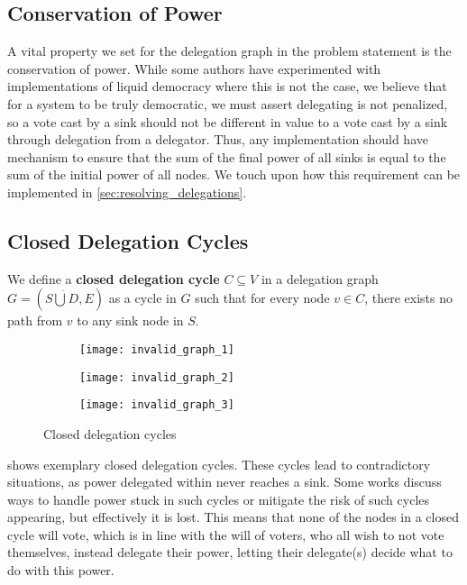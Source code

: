  \subsection{Conservation of Power}
 
 A vital property we set for the delegation graph in the problem statement is the conservation of power. While some authors have experimented with implementations of liquid democracy where this is not the case, we believe that for a system to be truly democratic, we must assert delegating is not penalized, so a vote cast by a sink should not be different in value to a vote cast by a sink through delegation from a delegator. \cite{bersetcheGeneralizingLiquidDemocracy2022, boldiViscousDemocracySocial2011} Thus, any implementation should have mechanism to ensure that the sum of the final power of all sinks is equal to the sum of the initial power of all nodes. We touch upon how this requirement can be implemented in \cref{sec:resolving_delegations}.

\subsection{Closed Delegation Cycles}
\label{subsec:cdc}

We define a \textbf{closed delegation cycle} $C \subseteq V$ in a delegation graph $G = (S \dot\bigcup D, E)$ as a cycle in $G$ such that for every node $v \in C$, there exists no path from $v$ to any sink node in $S$.

\begin{figure}[t]
    \centering
    \begin{subfigure}[t]{0.32\textwidth}
        \centering
        \texttt{[image: invalid\_graph\_1]}
    \end{subfigure}
    \hfill
    \begin{subfigure}[t]{0.32\textwidth}
        \centering
        \texttt{[image: invalid\_graph\_2]}
    \end{subfigure}
    \hfill
    \begin{subfigure}[t]{0.32\textwidth}
        \centering
        \texttt{[image: invalid\_graph\_3]}
    \end{subfigure}
    \caption{Closed delegation cycles}
    \label{fig:closed-delegation-cycles}
\end{figure}

 shows exemplary closed delegation cycles. These cycles lead to contradictory situations, as power delegated within never reaches a sink. Some works discuss ways to handle power stuck in such cycles or mitigate the risk of such cycles appearing, but effectively it is lost. \cite{behrensCircularDelegationsMyth2015, brillInteractiveDemocracy2018} This means that none of the nodes in a closed cycle will vote, which is in line with the will of voters, who all wish to not vote themselves, instead delegate their power, letting their delegate(s) decide what to do with this power. 

